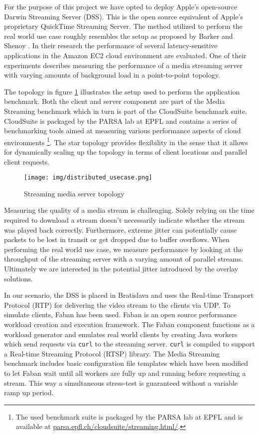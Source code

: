 For the purpose of this project we have opted to deploy Apple's open-source Darwin Streaming Server (DSS). This is the open source equivalent of Apple's proprietary QuickTime Streaming Server. The method utilized to perform the real world use case roughly resembles the setup as proposed by Barker and Shenoy \cite{barker2010empirical}. In their research the performance of several latency-sensitive applications in the Amazon EC2 cloud environment are evaluated. One of their experiments describes measuring the performance of a media streaming server with varying amounts of background load in a point-to-point topology.

The topology in figure \ref{fig:stream_topology} illustrates the setup used to perform the application benchmark. Both the client and server component are part of the Media Streaming benchmark which in turn is part of the CloudSuite benchmark suite. CloudSuite is packaged by the PARSA lab at EPFL and contains a series of benchmarking tools aimed at measuring various performance aspects of cloud environments \footnote{The used benchmark suite is packaged by the PARSA lab at EPFL and is available at \url{parsa.epfl.ch/cloudsuite/streaming.html/}.}. The star topology provides flexibility in the sense that it allows for dynamically scaling up the topology in terms of client locations and parallel client requests. 

\begin{figure}[!ht]
   \centering
   \texttt{[image: img/distributed\_usecase.png]}
   \caption{Streaming media server topology}
   \label{fig:stream_topology}
\end{figure}

Measuring the quality of a media stream is challenging. Solely relying on the time required to download a stream doesn't necessarily indicate whether the stream was played back correctly. Furthermore, extreme jitter can potentially cause packets to be lost in transit or get dropped due to buffer overflows. When performing the real world use case, we measure performance by looking at the throughput of the streaming server with a varying amount of parallel streams. Ultimately we are interested in the potential jitter introduced by the overlay solutions.
 
In our scenario, the DSS is placed in Bratislava and uses the Real-time Transport Protocol (RTP) for delivering the video stream to the clients via UDP. To simulate clients, Faban has been used. Faban is an open source performance workload creation and execution framework. The Faban component functions as a workload generator and emulates real world clients by creating Java workers which send requests via \texttt{curl} to the streaming server. \texttt{curl} is compiled to support a Real-time Streaming Protocol (RTSP) library. The Media Streaming benchmark includes basic configuration file templates which have been modified to let Faban wait until all workers are fully up and running before requesting a stream. This way a simultaneous stress-test is guaranteed without a variable ramp up period. 

